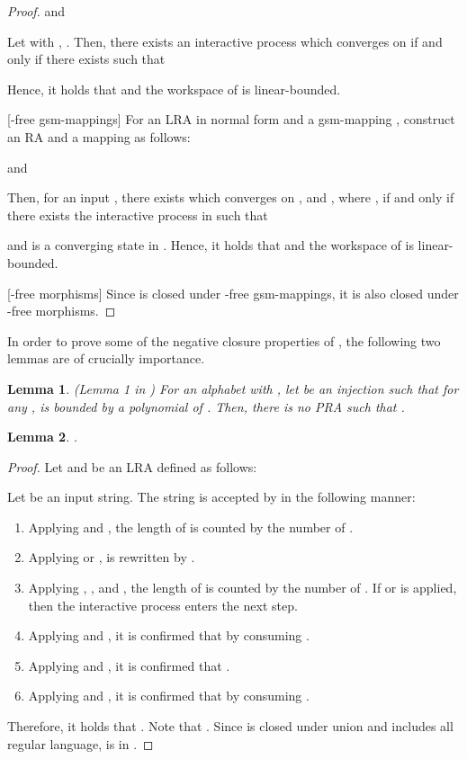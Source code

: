 \documentclass[preprint,fleqn,1p]{elsarticle}
\newtheorem{lem}{Lemma}
\begin{document}
\begin{proof}
and

Let  with , .  Then, there exists an interactive process  which converges on  if and only if there exists  such that

Hence, it holds that  and the workspace of  is linear-bounded.

[-free gsm-mappings] For an LRA  in normal form and a gsm-mapping , construct an RA  and a mapping   as follows:

and


Then, for an input ,  there exists   which converges on , and  
, where ,   if and only if  there exists the interactive process  in  such that

and  is a converging state in .  
Hence, it holds that  and the workspace of  is linear-bounded.

[-free morphisms] Since  is closed under -free gsm-mappings, it is also closed under -free morphisms.
\end{proof}

In order to prove some of the negative closure properties of , the following two lemmas are of crucially importance.

\begin{lem}{\rm (Lemma 1 in \cite{OKY:12})}
For an alphabet  with , let  be an injection such that for any ,  is bounded by a polynomial of . Then, there is no PRA  such that . 
\label{lem-ww}
\end{lem}

\begin{lem} 
. 
\label{lem-nww}
\end{lem}

\begin{proof}
Let  and  be an LRA defined as follows:

Let  be an input string. The string  is accepted by  in the following manner: 
\begin{enumerate}
\item Applying  and , the length of  is counted by the number of . 
\item Applying  or ,  is rewritten by . 
\item Applying , ,  and , the length of  is counted by the number of . If  or  is applied, then the interactive process enters the next step. \item Applying  and , it is confirmed that  by consuming . 
\item Applying  and , it is confirmed that . 
\item Applying  and , it is confirmed that  by consuming .
\end{enumerate}

Therefore, it holds that . Note that . Since  is closed under union and includes all regular language,  is in .
\end{proof}
\end{document}
